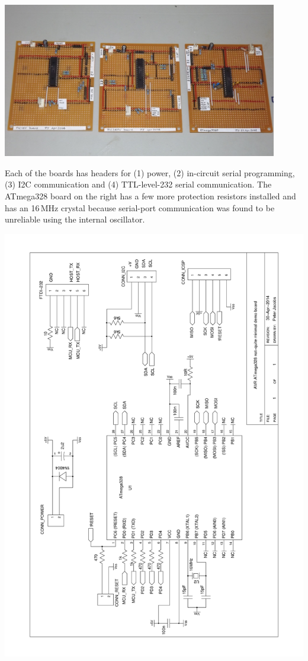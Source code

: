 \documentclass[12pt,a4paper]{article}
\begin{document}
\medskip
\centerline{
\includegraphics[width=0.9\textwidth]{../figs/home-built-minimal-boards-2014.jpeg}
}

\medskip\noindent
Each of the boards has headers for (1) power, (2) in-circuit serial programming, (3) I2C communication and
(4) TTL-level-232 serial communication.
The ATmega328 board on the right has a few more protection resistors installed and has
an 16\,MHz crystal because serial-port communication was found to be unreliable using the internal oscillator.

\newpage
\noindent
\includegraphics[width=\textwidth,angle=0,viewport=48 37 547 806]{../figs/demo-board-schematic-328.pdf}
\end{document}
